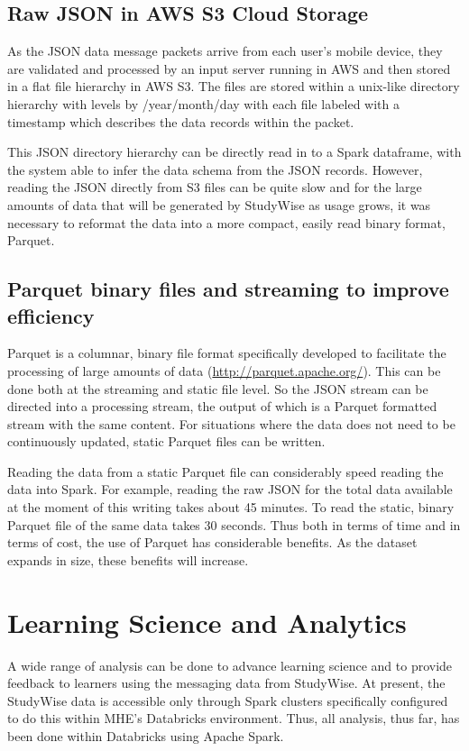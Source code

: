 \documentclass[runningheads,a4paper]{llncs}
\begin{document}
\subsection{Raw JSON in AWS S3 Cloud Storage}

As the JSON data message packets arrive from each user's mobile device, they are validated and processed by an input server running in AWS and then stored in a flat file hierarchy in AWS S3.  The files are stored within a unix-like directory hierarchy with levels by /year/month/day with each file labeled with a timestamp which describes the data records within the packet.  

This JSON directory hierarchy can be directly read in to a Spark dataframe, with the system able to infer the data schema from the JSON records.  However, reading the JSON directly from S3 files can be quite slow and for the large amounts of data that will be generated by StudyWise as usage grows, it was necessary to reformat the data into a more compact, easily read binary format, Parquet.

\subsection{Parquet binary files and streaming to improve efficiency}

Parquet is a columnar, binary file format specifically developed to facilitate the processing of large amounts of data (\url{http://parquet.apache.org/}).  This can be done both at the streaming and static file level.  So the JSON stream can be directed into a processing stream, the output of which is a Parquet formatted stream with the same content.  For situations where the data does not need to be continuously updated, static Parquet files can be written.

Reading the data from a static Parquet file can considerably speed reading the data into Spark.  For example, reading the raw JSON for the total data available at the moment of this writing takes about 45 minutes.  To read the static, binary Parquet file of the same data takes 30 seconds.  Thus both in terms of time and in terms of cost, the use of Parquet has considerable benefits.  As the dataset expands in size, these benefits will increase.

\section{Learning Science and Analytics}
A wide range of analysis can be done to advance learning science and to provide feedback to learners using the messaging data from StudyWise.  At present, the StudyWise data is accessible only through Spark clusters specifically configured to do this within MHE's Databricks environment.  Thus, all analysis, thus far, has been done within Databricks using Apache Spark.
\end{document}
